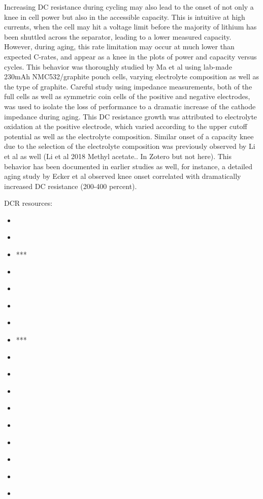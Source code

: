 \documentclass{article}
\begin{document}
Increasing DC resistance during cycling may also lead to the onset of not only a knee in cell power but also in the accessible capacity. This is intuitive at high currents, when the cell may hit a voltage limit before the majority of lithium has been shuttled across the separator, leading to a lower measured capacity. However, during aging, this rate limitation may occur at much lower than expected C-rates, and appear as a knee in the plots of power and capacity versus cycles. This behavior was thoroughly studied by Ma et al \cite{ma_editors_2019} using lab-made 230mAh NMC532/graphite pouch cells, varying electrolyte composition as well as the type of graphite. Careful study using impedance measurements, both of the full cells as well as symmetric coin cells of the positive and negative electrodes, was used to isolate the loss of performance to a dramatic increase of the cathode impedance during aging. This DC resistance growth was attributed to electrolyte oxidation at the positive electrode, which varied according to the upper cutoff potential as well as the electrolyte composition. Similar onset of a capacity knee due to the selection of the electrolyte composition was previously observed by Li et al as well (Li et al 2018 Methyl acetate.. In Zotero but not here). This behavior has been documented in earlier studies as well, for instance, a detailed aging study by Ecker et al \cite{ecker_calendar_2014} observed knee onset correlated with dramatically increased DC resistance (200-400 percent).

DCR resources:
\begin{itemize}
    \item \cite{willenberg_high-precision_2020}
    \item \cite{broussely_main_2005}
    \item \cite{ecker_calendar_2014}***
    \item \cite{schuster_nonlinear_2015}
    \item \cite{lewerenz_systematic_2017}
    \item \cite{lewerenz_post-mortem_2017}
    \item \cite{martinez-laserna_technical_2018}
    \item \cite{ma_editors_2019}***
    \item \cite{braco_experimental_2020}
    \item \cite{frisco_understanding_2016}
    \item \cite{klett_non-uniform_2014}
    \item \cite{pfrang_long-term_2018}
    \item \cite{keil_linear_2019}
    \item \cite{keil_charging_2016}
    \item \cite{rahe_nanoscale_2019}
    \item \cite{mandli_analysis_2019}
    \item \cite{wunsch_investigation_2019}
\end{itemize}
\end{document}
